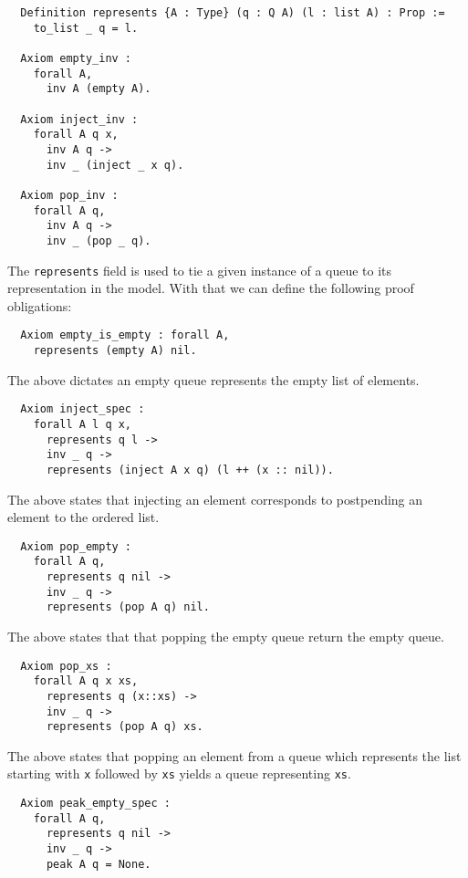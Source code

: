 \documentclass[a4paper, 12pt]{article}
\begin{document}
\begin{lstlisting}
  Definition represents {A : Type} (q : Q A) (l : list A) : Prop :=
    to_list _ q = l.

  Axiom empty_inv :
    forall A, 
      inv A (empty A).

  Axiom inject_inv :
    forall A q x,
      inv A q ->
      inv _ (inject _ x q).

  Axiom pop_inv :
    forall A q,
      inv A q ->
      inv _ (pop _ q).
\end{lstlisting}

The \lstinline{represents} field is used to tie a given instance of a
queue to its representation in the model. With that we can define the
following proof obligations:

\begin{lstlisting}
  Axiom empty_is_empty : forall A,
    represents (empty A) nil.
\end{lstlisting}

The above dictates an empty queue represents the empty list of elements.

\begin{lstlisting}  
  Axiom inject_spec :
    forall A l q x,
      represents q l ->
      inv _ q ->
      represents (inject A x q) (l ++ (x :: nil)).
\end{lstlisting}

The above states that injecting an element corresponds to postpending
an element to the ordered list.

\begin{lstlisting}  
  Axiom pop_empty :
    forall A q,
      represents q nil ->
      inv _ q ->
      represents (pop A q) nil.
\end{lstlisting}

The above states that that popping the empty queue return the empty queue.

\begin{lstlisting}  
  Axiom pop_xs :
    forall A q x xs,
      represents q (x::xs) ->
      inv _ q ->
      represents (pop A q) xs.
\end{lstlisting}

The above states that popping an element from a queue which represents
the list starting with \lstinline{x} followed by \lstinline{xs} yields
a queue representing \lstinline{xs}.

\begin{lstlisting}    
  Axiom peak_empty_spec :
    forall A q,
      represents q nil ->
      inv _ q -> 
      peak A q = None.
\end{lstlisting}
\end{document}
